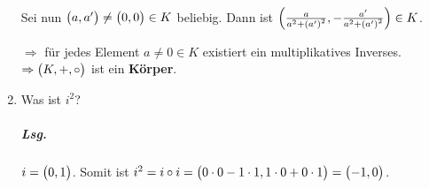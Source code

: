 \documentclass{scrreprt}
\begin{document}
\begin{enumerate}[(1)]
  Sei nun $\qty\big(a, a') \ne \qty\big(0, 0) \in K$ beliebig.
  Dann ist
  $\qty(\frac{a}{a^2 + \qty(a')^2}, -\frac{a'}{a^2 + \qty(a')^2}) \in K$.
  $\Rightarrow$ für jedes Element $a \ne 0 \in K$ existiert ein multiplikatives
  Inverses. \\
  $\Rightarrow \qty\big(K, +, \circ)$ ist ein \textbf{Körper}.

\item Was ist $i^2$?

  \subparagraph{Lsg.} $i = \qty\big(0, 1)$.
  Somit ist $i^2 = i \circ i =
  \qty\big(0 \cdot 0 - 1 \cdot 1, 1 \cdot 0 + 0 \cdot 1) = \qty\big(-1, 0)$.

\end{enumerate}
\end{document}
